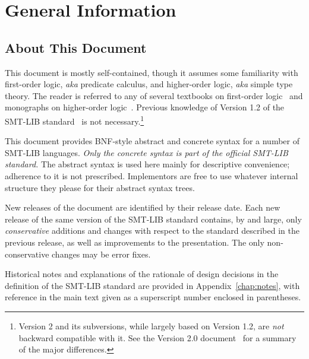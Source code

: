 

\chapter{General Information}
\thispagestyle{empty}


\section{About This Document}

This document is mostly self-contained, though 
it assumes some familiarity with first-order logic, \emph{aka} predicate calculus,
and higher-order logic, \emph{aka} simple type theory.
The reader is referred to any of several textbooks 
on first-order logic~\cite{Gal-86,Fit-96,Hen-01,Men-09} 
and monographs on higher-order logic~\cite{andrews86,HOL}.
Previous knowledge of Version 1.2 of the SMT-LIB standard~\cite{RanTin-RR-06}
is not necessary.\footnote{%
Version 2 and its subversions,
while largely based on Version 1.2, 
are \emph{not} backward compatible with it.
See the Version 2.0 document~\cite{BarST-RR-10} for a summary of the major differences.
}

This document provides BNF-style abstract and concrete syntax 
for a number of SMT-LIB languages.
\emph{Only the concrete syntax is part of the official SMT-LIB standard.}
The abstract syntax is used here mainly for descriptive convenience;
adherence to it is not prescribed.
Implementors are free to use whatever internal structure 
they please for their abstract syntax trees.
\medskip

New releases of the document are identified by their release date.
Each new release of the same version of the SMT-LIB standard 
contains, by and large, only \emph{conservative} additions and 
changes with respect to the standard described in the previous release,
as well as improvements to the presentation.
The only non-conservative changes may be error fixes.

Historical notes and 
explanations of the rationale of design decisions
in the definition of the SMT-LIB standard are provided 
in Appendix~\ref{chap:notes}, 
with reference in the main text given as a superscript number 
enclosed in parentheses.

